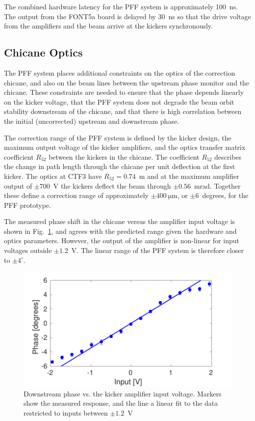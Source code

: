 \documentclass[%
 reprint,
 amsmath,amssymb,
 prl,
]{revtex4-1}
\begin{document}
The combined hardware latency for the PFF system is approximately 100~ns. The 
output from the FONT5a board is delayed by 30~ns so that the drive voltage from 
the amplifiers and the beam arrive at the kickers synchronously.

\subsection{\label{ss:optics}Chicane Optics}

The PFF system places additional constraints on the optics of the correction 
chicane, and also on the beam lines between the upstream phase monitor and the 
chicane. These constraints are needed to ensure that the phase depends linearly 
on the kicker voltage, that the PFF system does not degrade the beam 
orbit stability downstream of the chicane, and that there is high 
correlation between the initial (uncorrected) upstream and downstream phase.

The correction range of the PFF system is defined by the kicker design, the 
maximum output voltage of the kicker amplifiers, and the optics transfer matrix 
coefficient \(R_{52}\) between the kickers in the chicane. The coefficient 
\(R_{52}\) describes the change in path length through the chicane per unit 
deflection at the first kicker. The optics at CTF3 have \(R_{52} = 0.74\)~m and 
at the maximum amplifier output 
of \(\pm700\)~V the kickers deflect the beam through \(\pm0.56\)~mrad. Together 
these 
define a correction range of approximately \(\pm400~\mathrm{\mu m}\), or 
\(\pm6\)~degrees, for the PFF 
prototype.

The measured phase shift in the chicane versus the amplifier input voltage is 
shown in Fig.~\ref{fig:corrRange}, and agrees with the predicted range given 
the hardware and optics parameters. However, the output of the amplifier is 
non-linear for input voltages outside \(\pm1.2\)~V. The 
linear range of the PFF system is therefore closer to \(\pm4^\circ\).


\begin{figure}
	\includegraphics[width=\columnwidth]{figs/corrRange}
	\caption{\label{fig:corrRange}Downstream phase vs. the kicker amplifier 
	input voltage. Markers show the measured response, and the line a linear 
	fit to the data restricted to inputs between \(\pm1.2\)~V}
\end{figure}
\end{document}
